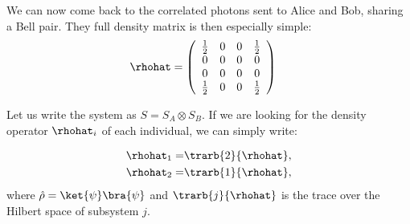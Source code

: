 We can now come back to the correlated photons sent to Alice and Bob, sharing a Bell pair. They full density matrix is then especially simple:
\begin{align}
  \rhohat &= \left(\begin{array}{cccc}
  \frac{1}{2}& 0& 0 &\frac{1}{2}\\
  0 & 0 & 0& 0\\
  0&0&0&0\\
    \frac{1}{2}&0&0&\frac{1}{2}
  \end{array}\right)
\end{align}

Let us write the system as $S = S_A \otimes S_B$.  If we are looking for the density operator $\rhohat_i$ of each individual, we can simply write:

\begin{align}
	\rhohat_1=&\trarb{2}{\rhohat},\\
				\rhohat_2=&\trarb{1}{\rhohat},
					\end{align}
					where $\hat{\rho}=\ket{\psi}\bra{\psi}$ and $\trarb{j}{\rhohat}$ is the trace over the Hilbert space of subsystem $j$.
